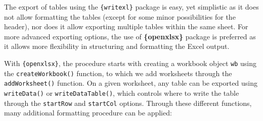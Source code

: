 \documentclass[
]{book}
\begin{document}
The export of tables using the \texttt{\{writexl\}} package is easy, yet simplistic as it does not allow formatting the tables (except for some minor possibilities for the header), nor does it allow exporting multiple tables within the same sheet. For more advanced exporting options, the use of \textbf{\{openxlsx\}} package is preferred as it allows more flexibility in structuring and formatting the Excel output.

With \texttt{\{openxlsx\}}, the procedure starts with creating a workbook object \texttt{wb} using the \texttt{createWorkbook()} function, to which we add worksheets through the \texttt{addWorksheet()} function.
On a given worksheet, any table can be exported using \texttt{writeData()} or \texttt{writeDataTable()}, which controls where to write the table through the \texttt{startRow} and \texttt{startCol} options.
Through these different functions, many additional formatting procedure can be applied:
\end{document}
